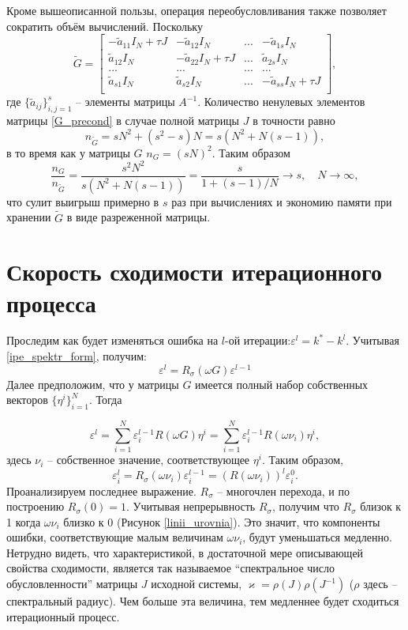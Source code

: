 \documentclass[a4paper, 14pt]{extreport} %
\begin{document}
Кроме вышеописанной пользы, операция переобусловливания также позволяет сократить объём вычислений. Поскольку
\begin{equation}
\label{G_precond}
\tilde G = \begin{bmatrix}
-\tilde a_{11}I_N+\tau J& -\tilde a_{12}I_N&...&-\tilde a_{1s}I_N\\
 \tilde a_{12}I_N&-\tilde a_{22}I_N+\tau J&...& \tilde a_{2s}I_N\\
...&...&...&...\\
\tilde a_{s1}I_N& \tilde a_{s2}I_N&...&-\tilde a_{ss}I_N +\tau J\\
\end{bmatrix},
\end{equation}
где $\{\tilde a_{ij}\}_{i,j=1}^{s}$ -- элементы матрицы $A^{-1}$. Количество ненулевых элементов матрицы \eqref{G_precond} в случае полной матрицы $J$ в точности равно
$$ n_{\tilde G}= s N^2 +(s^2-s)N = s (N^2+N(s-1)),$$
в то время как у матрицы $G$ $n_G = (sN)^2$. Таким образом %
$$\frac{n_G}{n_{\tilde G}}=\frac{s^2N^2}{ s (N^2+N(s-1))}=\frac{s}{1+(s-1)/N} \to s, \quad N \to\infty,$$
что сулит выигрыш примерно в $s$ раз при вычислениях и экономию памяти при хранении  $\tilde G$ в виде разреженной матрицы.


\section{Скорость сходимости итерационного процесса}
Проследим как будет изменяться ошибка на $l$-ой итерации:$\varepsilon^l= k^* - k^l$. Учитывая \eqref{ipe_spektr_form}, получим:
$$\varepsilon^l = R_\sigma (\omega G)\varepsilon^{l-1}$$
Далее предположим, что у матрицы $G$ имеется полный набор собственных векторов $\{\eta^i\}_{i=1}^N$. Тогда

$$ \varepsilon^l = \sum_{i = 1}^{N}\varepsilon_i^{l-1}R(\omega G) \eta^i = \sum_{i=1}^{N}\varepsilon_i^{l-1}R(\omega \nu_i )\eta^i,$$
здесь $\nu_i$ -- собственное значение, соответствующее $\eta^i$. Таким образом,%
$$ \varepsilon_i^l = R_\sigma(\omega \nu_i) \varepsilon_i^{l-1} = (R(\omega \nu_i))^l\varepsilon_i^0.$$
Проанализируем последнее выражение. $R_\sigma$ -- многочлен перехода, и по построению $R_\sigma(0) = 1$. Учитывая непрерывность $R_\sigma$, получим что $R_\sigma$ близок к 1 когда $\omega \nu_i$ близко к 0 (Рисунок \ref{linii_urovnia}). Это значит, что компоненты ошибки, соответствующие малым величинам $\omega \nu_i$, будут уменьшаться медленно. Нетрудно видеть, что характеристикой,  в достаточной мере описывающей свойства сходимости, является так называемое ``спектральное число обусловленности'' матрицы $J$ исходной системы, $\varkappa = \rho(J) \rho(J^{-1})$ ($\rho$ здесь -- спектральный радиус). Чем больше эта величина, тем медленнее будет сходиться итерационный процесс.
\end{document}
